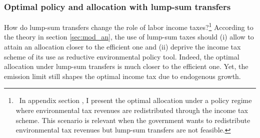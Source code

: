 \subsubsection{Optimal policy and allocation with lump-sum transfers}\label{subsec:comp_lumpsum}

How do lump-sum transfers change the role of labor income taxes?\footnote{\ In appendix section , I present the optimal allocation under a policy regime where environmental tax revenues are redistributed through the income tax scheme. This scenario is relevant when the government wants to redistribute environmental tax revenues but lump-sum transfers are not feasible.}
 According to the theory in section \ref{sec:mod_an}, the use of lump-sum taxes should (i)  allow to attain an allocation closer to the efficient one and (ii) deprive the income tax scheme of its use as reductive environmental policy tool. Indeed, the optimal allocation under lump-sum transfers is much closer to the efficient one. 
 Yet, the emission limit still shapes the optimal income tax due to endogenous growth. 
  

